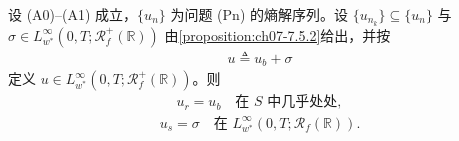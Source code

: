 \documentclass[../../main.tex]{subfiles}%
\begin{document}
\begin{proposition}\label{proposition:ch07-7.5.5}
设 (A0)--(A1) 成立，$\{u_n\}$ 为问题 (Pn) 的熵解序列。设 $\{u_{n_k}\}\subseteq\{u_n\}$ 与 $\sigma\in L^\infty_{w^*}(0,T;\mathscr{R}_f^+(\mathbb{R}))$ 由\cref{proposition:ch07-7.5.2}给出，并按
\begin{align}
u\triangleq u_b+\sigma \label{align:ch07-7.108}
\end{align}
定义 $u\in L^\infty_{w^*}(0,T;\mathscr{R}_f^+(\mathbb{R}))$。则
\begin{align}
u_r=u_b\quad\text{在 }S\text{ 中几乎处处}, \label{align:ch07-7.109a}
\end{align}
\begin{align}
u_s=\sigma\quad\text{在 }L^\infty_{w^*}(0,T;\mathscr{R}_f(\mathbb{R})). \label{align:ch07-7.109b}
\end{align}
\end{proposition}
\end{document}
